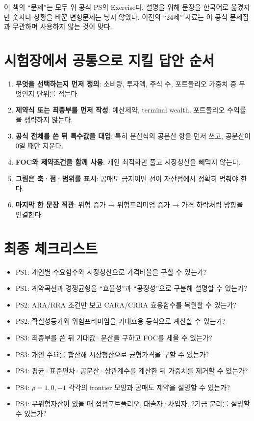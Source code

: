 \documentclass[10.5pt,a4paper]{article}
\begin{document}
\begin{warningbox}
이 책의 ``문제''는 모두 위 공식 PS의 Exercise다. 설명을 위해 문장을 한국어로 옮겼지만 숫자나 상황을 바꾼 변형문제는 넣지 않았다. 이전의 ``24제'' 자료는 이 공식 문제집과 무관하며 사용하지 않는 것이 맞다.
\end{warningbox}

\section*{시험장에서 공통으로 지킬 답안 순서}
\begin{enumerate}
\item \textbf{무엇을 선택하는지 먼저 정의}: 소비량, 투자액, 주식 수, 포트폴리오 가중치 중 무엇인지 단위를 적는다.
\item \textbf{제약식 또는 최종부를 먼저 작성}: 예산제약, terminal wealth, 포트폴리오 수익률을 생략하지 않는다.
\item \textbf{공식 전체를 쓴 뒤 특수값을 대입}: 특히 분산식의 공분산 항을 먼저 쓰고, 공분산이 0일 때만 지운다.
\item \textbf{FOC와 제약조건을 함께 사용}: 개인 최적화만 풀고 시장청산을 빼먹지 않는다.
\item \textbf{그림은 축·점·범위를 표시}: 공매도 금지이면 선이 자산점에서 정확히 멈춰야 한다.
\item \textbf{마지막 한 문장 직관}: 위험 증가 → 위험프리미엄 증가 → 가격 하락처럼 방향을 연결한다.
\end{enumerate}






\clearpage
\section*{최종 체크리스트}
\begin{tcolorbox}[colback=mint,colframe=green,boxrule=0.8pt,arc=2mm]
\begin{itemize}
\item PS1: 개인별 수요함수와 시장청산으로 가격비율을 구할 수 있는가?
\item PS1: 계약곡선과 경쟁균형을 ``효율성''과 ``공정성''으로 구분해 설명할 수 있는가?
\item PS2: ARA/RRA 조건만 보고 CARA/CRRA 효용함수를 복원할 수 있는가?
\item PS2: 확실성등가와 위험프리미엄을 기대효용 등식으로 계산할 수 있는가?
\item PS3: 최종부를 쓴 뒤 기대값·분산을 구하고 FOC를 세울 수 있는가?
\item PS3: 개인 수요를 합산해 시장청산으로 균형가격을 구할 수 있는가?
\item PS4: 평균·표준편차·공분산·상관계수를 계산한 뒤 가중치를 제거할 수 있는가?
\item PS4: $\rho=1,0,-1$ 각각의 frontier 모양과 공매도 제약을 설명할 수 있는가?
\item PS4: 무위험자산이 있을 때 접점포트폴리오, 대출자·차입자, 2기금 분리를 설명할 수 있는가?
\end{itemize}
\end{tcolorbox}
\end{document}
